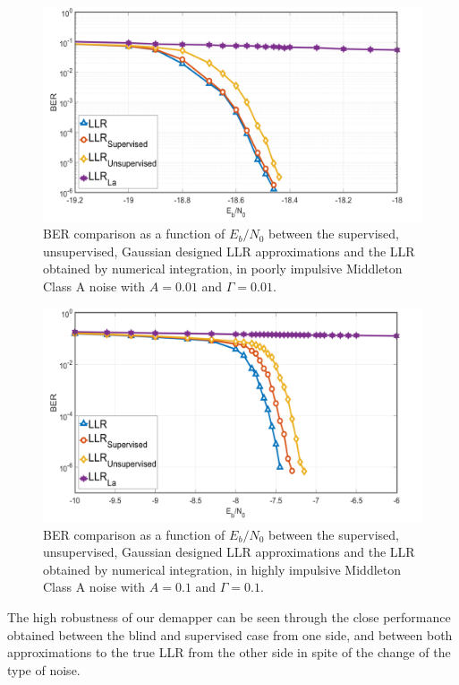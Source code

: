 \documentclass[a4paper]{IEEEtran}
\begin{document}
\begin{figure}
  \centering \includegraphics[width=\linewidth]{fig-16}
  \caption{BER comparison as a function of $E_b/N_0$ between
    the supervised, unsupervised, Gaussian designed LLR
    approximations and the LLR obtained by numerical
    integration, in poorly impulsive Middleton Class A noise
    with $ A=0.01$ and $\Gamma=0.01$.}
  \label{fig:16}
\end{figure}

\begin{figure}
  \centering \includegraphics[width=\linewidth]{fig-17}
  \caption{BER comparison as a function of $E_b/N_0$ between
    the supervised, unsupervised, Gaussian designed LLR
    approximations and the LLR obtained by numerical
    integration, in highly impulsive Middleton Class A noise
    with $A=0.1$ and $\Gamma=0.1$.}
  \label{fig:17}
\end{figure}

The high robustness of our demapper can be seen through the
close performance obtained between the blind and supervised
case from one side, and between both approximations to the
true LLR from the other side in spite of the change of the
type of noise.
\end{document}
